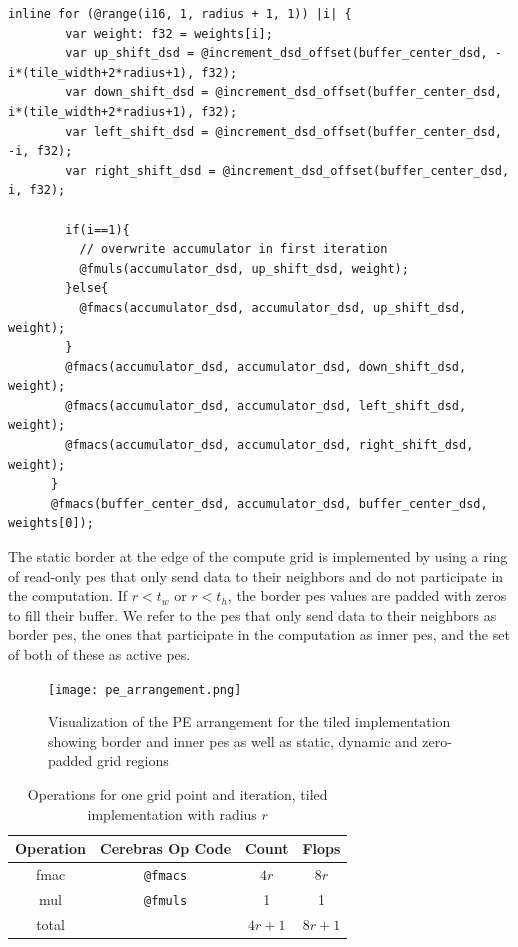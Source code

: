 \begin{lstlisting}[language=CSL, caption={CSL code excerpt for the tiled implementation}, label={lst:tiled_implementation}]
    inline for (@range(i16, 1, radius + 1, 1)) |i| {
        var weight: f32 = weights[i];
        var up_shift_dsd = @increment_dsd_offset(buffer_center_dsd, -i*(tile_width+2*radius+1), f32);
        var down_shift_dsd = @increment_dsd_offset(buffer_center_dsd, i*(tile_width+2*radius+1), f32);
        var left_shift_dsd = @increment_dsd_offset(buffer_center_dsd, -i, f32);
        var right_shift_dsd = @increment_dsd_offset(buffer_center_dsd, i, f32);
  
        if(i==1){
          // overwrite accumulator in first iteration
          @fmuls(accumulator_dsd, up_shift_dsd, weight);
        }else{
          @fmacs(accumulator_dsd, accumulator_dsd, up_shift_dsd, weight);
        }
        @fmacs(accumulator_dsd, accumulator_dsd, down_shift_dsd, weight);
        @fmacs(accumulator_dsd, accumulator_dsd, left_shift_dsd, weight);
        @fmacs(accumulator_dsd, accumulator_dsd, right_shift_dsd, weight);
      }
      @fmacs(buffer_center_dsd, accumulator_dsd, buffer_center_dsd, weights[0]);
\end{lstlisting}

The static border at the edge of the compute grid is implemented by using a ring of read-only \acp{pe} that only send data to their neighbors and do not participate in the computation. If $r<t_w$ or $r<t_h$, the border \acp{pe} values are padded with zeros to fill their buffer. We refer to the \acp{pe} that only send data to their neighbors as border \acp{pe}, the ones that participate in the computation as inner \acp{pe}, and the set of both of these as active \acp{pe}.

\begin{figure}
    \centering
    \texttt{[image: pe\_arrangement.png]}
    \caption{Visualization of the PE arrangement for the tiled implementation showing border and inner \acp{pe} as well as static, dynamic and zero-padded grid regions}
    \label{fig:pe_arrangement}
\end{figure}

\begin{table}[h]
    \centering
    \caption{Operations for one grid point and iteration, tiled implementation with radius $r$}
    \label{tab:tiled_operations}
    \begin{tabular}{@{}cccc@{}}
        \toprule
        Operation & Cerebras Op Code & Count & Flops \\
        \midrule
        fmac & \texttt{@fmacs} & $4r$ & $8r$ \\
        mul & \texttt{@fmuls} & \num{1} & \num{1} \\
        \midrule
        total & & $4r+1$ & $8r+1$ \\
        \bottomrule
    \end{tabular}
\end{table}

